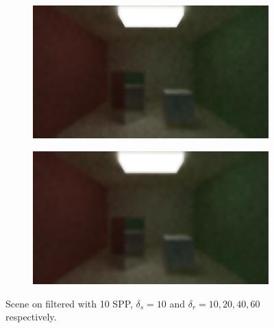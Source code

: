 \documentclass[titlepage,12pt]{report}
\begin{document}
\begin{figure}[H]
	\begin{subfigure}{.48\textwidth}
		\centering
		\includegraphics[scale=0.2]{media/bilateral/cornell_normal_10_bilateral_filter_21_10_40.png}
		\label{bilateral_filter_7}
	\end{subfigure}
	\begin{subfigure}{.48\textwidth}
		\centering
		\includegraphics[scale=0.2]{media/bilateral/cornell_normal_10_bilateral_filter_21_10_60.png}
		\label{bilateral_filter_8}
	\end{subfigure}
	\caption{Scene on filtered with 10 SPP, $\delta_s = 10$ and $\delta_r = 10, 20, 40, 60$ respectively.}
	\label{bilateral_filter_02}
\end{figure}
\end{document}
